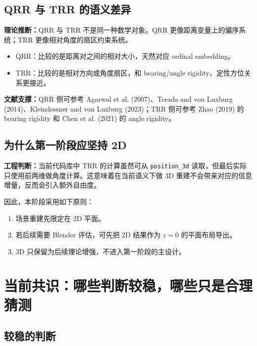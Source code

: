 \documentclass[11pt,a4paper]{ctexart}
\newcommand{\evidence}[1]{\textbf{文献支撑：}#1}
\newcommand{\engineering}[1]{\textbf{工程判断：}#1}
\newcommand{\theorynote}[1]{\textbf{理论推断：}#1}
\begin{document}
\subsection{QRR 与 TRR 的语义差异}

\theorynote{QRR 与 TRR 不是同一种数学对象。QRR 更像距离变量上的偏序系统；TRR 更像相对角度的扇区约束系统。}

\begin{itemize}
  \item QRR：比较的是距离对之间的相对大小，天然对应 ordinal embedding。
  \item TRR：比较的是相对方向或角度扇区，和 bearing/angle rigidity、定性方位关系更接近。
\end{itemize}

\evidence{QRR 侧可参考 Agarwal et al. (2007)、Terada and von Luxburg (2014)、Kleindessner and von Luxburg (2023)；TRR 侧可参考 Zhao (2019) 的 bearing rigidity 和 Chen et al. (2021) 的 angle rigidity。}

\subsection{为什么第一阶段应坚持 2D}

\engineering{当前代码库中 TRR 的计算虽然可从 \texttt{position\_3d} 读取，但最后实际只使用前两维做角度计算。这意味着在当前语义下做 3D 重建不会带来对应的信息增量，反而会引入额外自由度。}

因此，本阶段采用如下原则：
\begin{enumerate}[label=\arabic*.]
  \item 场景重建先限定在 2D 平面。
  \item 若后续需要 Blender 评估，可先把 2D 结果作为 $z=0$ 的平面布局导出。
  \item 3D 只保留为后续理论增强，不进入第一阶段的主设计。
\end{enumerate}

\section{当前共识：哪些判断较稳，哪些只是合理猜测}

\subsection{较稳的判断}
\end{document}
